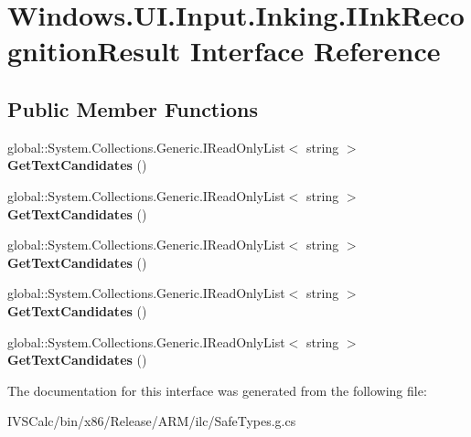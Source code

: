 \hypertarget{interface_windows_1_1_u_i_1_1_input_1_1_inking_1_1_i_ink_recognition_result}{}\section{Windows.\+U\+I.\+Input.\+Inking.\+I\+Ink\+Recognition\+Result Interface Reference}
\label{interface_windows_1_1_u_i_1_1_input_1_1_inking_1_1_i_ink_recognition_result}
\subsection*{Public Member Functions}
\begin{DoxyCompactItemize}
\item 
\mbox{\label{interface_windows_1_1_u_i_1_1_input_1_1_inking_1_1_i_ink_recognition_result_ab83b3783be382a093e5de19cb0b6a912}} 
global\+::\+System.\+Collections.\+Generic.\+I\+Read\+Only\+List$<$ string $>$ {\bfseries Get\+Text\+Candidates} ()
\item 
\mbox{\label{interface_windows_1_1_u_i_1_1_input_1_1_inking_1_1_i_ink_recognition_result_ab83b3783be382a093e5de19cb0b6a912}} 
global\+::\+System.\+Collections.\+Generic.\+I\+Read\+Only\+List$<$ string $>$ {\bfseries Get\+Text\+Candidates} ()
\item 
\mbox{\label{interface_windows_1_1_u_i_1_1_input_1_1_inking_1_1_i_ink_recognition_result_ab83b3783be382a093e5de19cb0b6a912}} 
global\+::\+System.\+Collections.\+Generic.\+I\+Read\+Only\+List$<$ string $>$ {\bfseries Get\+Text\+Candidates} ()
\item 
\mbox{\label{interface_windows_1_1_u_i_1_1_input_1_1_inking_1_1_i_ink_recognition_result_ab83b3783be382a093e5de19cb0b6a912}} 
global\+::\+System.\+Collections.\+Generic.\+I\+Read\+Only\+List$<$ string $>$ {\bfseries Get\+Text\+Candidates} ()
\item 
\mbox{\label{interface_windows_1_1_u_i_1_1_input_1_1_inking_1_1_i_ink_recognition_result_ab83b3783be382a093e5de19cb0b6a912}} 
global\+::\+System.\+Collections.\+Generic.\+I\+Read\+Only\+List$<$ string $>$ {\bfseries Get\+Text\+Candidates} ()
\end{DoxyCompactItemize}


The documentation for this interface was generated from the following file\+:\begin{DoxyCompactItemize}
\item 
I\+V\+S\+Calc/bin/x86/\+Release/\+A\+R\+M/ilc/Safe\+Types.\+g.\+cs\end{DoxyCompactItemize}
